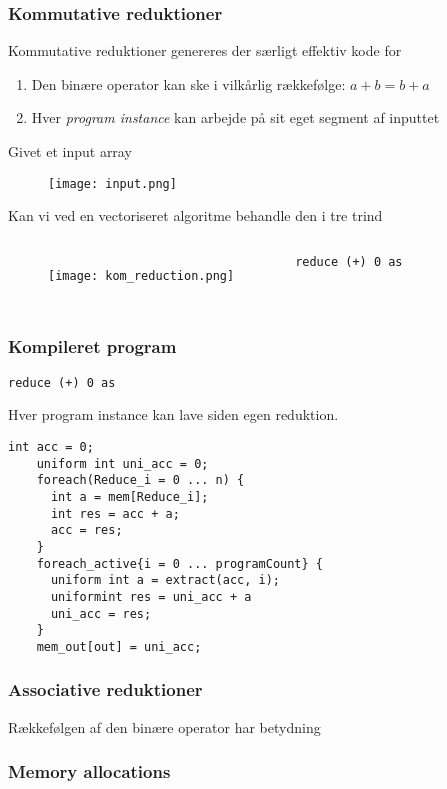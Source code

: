 \documentclass{beamer}
\begin{document}
\begin{frame}[fragile]
  \frametitle{Kommutative reduktioner}
  \begin{block}{Kommutative reduktioner genereres der særligt effektiv kode for}
  \begin{enumerate}
    \item Den binære operator kan ske i vilkårlig rækkefølge: $a + b = b + a$
    \item Hver \textit{program instance} kan arbejde på sit eget segment af inputtet
  \end{enumerate}
  \end{block}
Givet et input array
\begin{figure}[h!]
  \centering
  \texttt{[image: input.png]}
\end{figure}
  Kan vi ved en vectoriseret algoritme behandle den i tre trind
  \begin{columns}
  \begin{figure}[h!]
    \centering
    \texttt{[image: kom\_reduction.png]}
  \end{figure}

  \begin{lstlisting}[language=futhark]
    reduce (+) 0 as
  \end{lstlisting}

  \end{columns}
\end{frame}
\begin{frame}[fragile]
  \frametitle{Kompileret program}
  \begin{lstlisting}[language=futhark]
    reduce (+) 0 as
  \end{lstlisting}
  Hver program instance kan lave siden egen reduktion.
  \begin{lstlisting}[language=ispc]
    int acc = 0;
    uniform int uni_acc = 0;
    foreach(Reduce_i = 0 ... n) {
      int a = mem[Reduce_i];
      int res = acc + a;
      acc = res;
    }
    foreach_active{i = 0 ... programCount} {
      uniform int a = extract(acc, i);
      uniformint res = uni_acc + a
      uni_acc = res;
    }
    mem_out[out] = uni_acc;
  \end{lstlisting}

\end{frame}

\begin{frame}[fragile]
  \frametitle{Associative reduktioner}
  Rækkefølgen af den binære operator har betydning
\end{frame}

\begin{frame}
  \frametitle{Memory allocations}
\end{frame}
\end{document}
